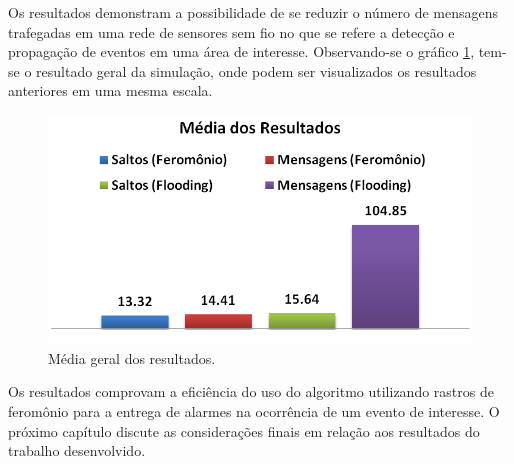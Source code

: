 Os resultados demonstram a possibilidade de se reduzir o número de mensagens trafegadas em uma rede de sensores sem fio no que se refere a detecção e propagação de eventos em uma área de interesse. Observando-se o gráfico \ref{fig:global_mean}, tem-se o resultado geral da simulação, onde podem ser visualizados os resultados anteriores em uma mesma escala.

\begin{figure}[h!]
 \centering
 \includegraphics{results/global_mean.png}
 \caption{Média geral dos resultados.}
  \label{fig:global_mean}
 \end{figure}

Os resultados comprovam a eficiência do uso do algoritmo utilizando rastros de feromônio para a entrega de alarmes na ocorrência de um evento de interesse. O próximo capítulo discute as considerações finais em relação aos resultados do trabalho desenvolvido.
